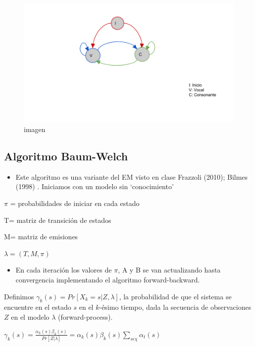 \documentclass[]{article}
\begin{document}
\begin{figure}[htbp]
\centering
\includegraphics{modelo_vocales.png}
\caption{imagen}
\end{figure}

\subsection{Algoritmo Baum-Welch}\label{algoritmo-baum-welch}

\begin{itemize}
\itemsep1pt\parskip0pt
\item
  Este algoritmo es una variante del EM visto en clase Frazzoli (2010);
  Bilmes (1998) . Iniciamos con un modelo sin `conocimiento'
\end{itemize}

\(\pi\) = probabilidades de iniciar en cada estado

T= matriz de transición de estados

M= matriz de emisiones

\(\lambda=(T,M,\pi)\)

\begin{itemize}
\itemsep1pt\parskip0pt
\item
  En cada iteración los valores de \(\pi\), A y B se van actualizando
  hasta convergencia implementando el algoritmo forward-backward.
\end{itemize}

Definimos \(\gamma_{k}(s)=Pr[X_{k}= s|Z,\lambda]\), la probabilidad de
que el sistema se encuentre en el estado \(s\) en el \(k\)-ésimo tiempo,
dada la secuencia de observaciones \(Z\) en el modelo \(\lambda\)
(forward-process).

\(\gamma_{k}(s)=\frac{\alpha_{k}(s)\beta_{k}(s)}{Pr[Z|\lambda]}=\alpha_{k}(s)\beta_{k}(s){\sum_{s\epsilon\chi}\alpha_{t}(s)}\)
\end{document}
